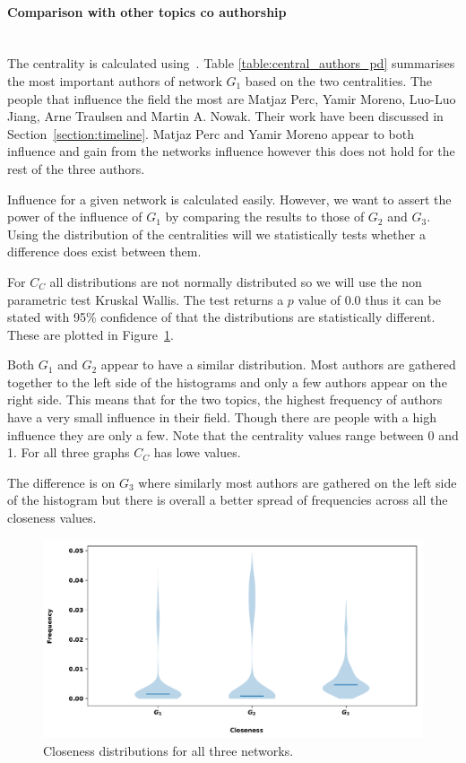 \documentclass{article}
\theoremstyle{definition}
\begin{document}
\paragraph{Comparison with other topics co authorship}
\mbox{ }\\

The centrality is calculated using~\cite{networkx}. Table
\ref{table:central_authors_pd} summarises the most important authors of network
\(G_1\) based on the two centralities. The people that influence the field the
most are Matjaz Perc, Yamir Moreno, Luo-Luo Jiang, Arne Traulsen and Martin A.
Nowak. Their work have been discussed in Section~\ref{section:timeline}.
Matjaz Perc and Yamir Moreno appear to both influence and gain from
the networks influence however this does not hold for the rest of the three authors.

Influence for a given network is calculated easily. However, we want to assert
the power of the influence of \(G_1\) by comparing the results to those of
\(G_2\) and \(G_3\). Using the distribution of the centralities will we
statistically tests whether a difference does exist between them.

For \(C_C\) all distributions are not normally distributed so we will use the
non parametric test Kruskal Wallis. The test returns a \(p\) value of 0.0 thus 
it can be stated with 95\% confidence of that the distributions are statistically
different. These are plotted in Figure~\ref{fig:closeness_dist}.

Both \(G_1\) and \(G_2\) appear to have a similar distribution. Most authors
are gathered together to the left side of the histograms and only a few authors
appear on the right side. This means that for the two topics, the highest
frequency of authors have a very small influence in their field. Though there 
are people with a high influence they are only a few. Note that the centrality
values range between 0 and 1. For all three graphs \(C_C\) has lowe values.

The difference is on \(G_3\) where similarly most authors are gathered on
the left side of the histogram but there is overall a better spread of frequencies
across all the closeness values.

\begin{figure}[!hbtp]
    \centering
    \includegraphics[width=\textwidth]{./assets/images/Closeness_histrograms.pdf}
    \caption{Closeness distributions for all three networks.}\label{fig:closeness_dist}
\end{figure}
\end{document}
